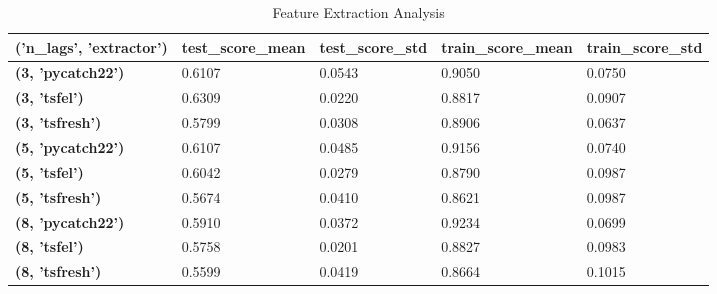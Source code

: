\begin{table}
\caption{Feature Extraction Analysis}
\label{tab:feature_extraction_analysis}
\begin{tabular}{lllll}
\toprule
('n\_lags', 'extractor') & test\_score\_mean & test\_score\_std & train\_score\_mean & train\_score\_std \\
\midrule
\textbf{(3, 'pycatch22')} & 0.6107 & 0.0543 & 0.9050 & 0.0750 \\
\textbf{(3, 'tsfel')} & 0.6309 & 0.0220 & 0.8817 & 0.0907 \\
\textbf{(3, 'tsfresh')} & 0.5799 & 0.0308 & 0.8906 & 0.0637 \\
\textbf{(5, 'pycatch22')} & 0.6107 & 0.0485 & 0.9156 & 0.0740 \\
\textbf{(5, 'tsfel')} & 0.6042 & 0.0279 & 0.8790 & 0.0987 \\
\textbf{(5, 'tsfresh')} & 0.5674 & 0.0410 & 0.8621 & 0.0987 \\
\textbf{(8, 'pycatch22')} & 0.5910 & 0.0372 & 0.9234 & 0.0699 \\
\textbf{(8, 'tsfel')} & 0.5758 & 0.0201 & 0.8827 & 0.0983 \\
\textbf{(8, 'tsfresh')} & 0.5599 & 0.0419 & 0.8664 & 0.1015 \\
\bottomrule
\end{tabular}
\end{table}